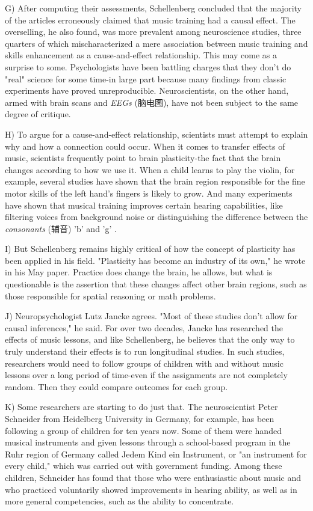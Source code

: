 \documentclass[UTF8,11pt]{ctexart}
\begin{document}
G) After computing their assessments, Schellenberg concluded that the majority of the articles erroneously claimed that music training had a causal effect. The overselling, he also found, was more prevalent among neuroscience studies, three quarters of which mischaracterized a mere association between music training and skills enhancement as a cause-and-effect relationship. This may come as a surprise to some. Psychologists have been battling charges that they don't do "real" science for some time-in large part because many findings from classic experiments have proved unreproducible. Neuroscientists, on the other hand, armed with brain scans and \textit{EEGs }(脑电图), have not been subject to the same degree of critique.


H) To argue for a cause-and-effect relationship, scientists must attempt to explain why and how a connection could occur. When it comes to transfer effects of music, scientists frequently point to brain plasticity-the fact that the brain changes according to how we use it. When a child learns to play the violin, for example, several studies have shown that the brain region responsible for the fine motor skills of the left hand's fingers is likely to grow. And many experiments have shown that musical training improves certain hearing capabilities, like filtering voices from background noise or distinguishing the difference between the \textit{consonants }(辅音) 'b' and 'g' .


I) But Schellenberg remains highly critical of how the concept of plasticity has been applied in his field. "Plasticity has become an industry of its own," he wrote in his May paper. Practice does change the brain, he allows, but what is questionable is the assertion that these changes affect other brain regions, such as those responsible for spatial reasoning or math problems.


J) Neuropsychologist Lutz Jancke agrees. "Most of these studies don't allow for causal inferences," he said. For over two decades, Jancke has researched the effects of music lessons, and like Schellenberg, he believes that the only way to truly understand their effects is to run longitudinal studies. In such studies, researchers would need to follow groups of children with and without music lessons over a long period of time-even if the assignments are not completely random. Then they could compare outcomes for each group.


K) Some researchers are starting to do just that. The neuroscientist Peter Schneider from Heidelberg University in Germany, for example, has been following a group of children for ten years now. Some of them were handed musical instruments and given lessons through a school-based program in the Ruhr region of Germany called Jedem Kind ein Instrument, or "an instrument for every child," which was carried out with government funding. Among these children, Schneider has found that those who were enthusiastic about music and who practiced voluntarily showed improvements in hearing ability, as well as in more general competencies, such as the ability to concentrate.
\end{document}
